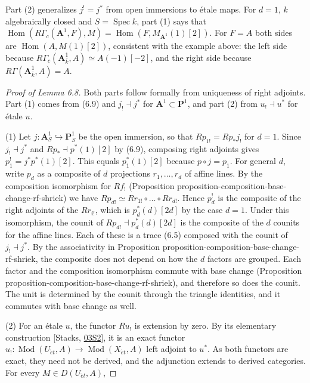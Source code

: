 \documentclass[11pt]{article}
\providecommand{\Hom}{}\renewcommand{\Hom}{\operatorname{Hom}}
\begin{document}
\label{bp539}%
Part (2) generalizes \(j^!=j^*\) from open immersions to étale maps. For \(d=1\), \(k\) algebraically closed and \(S=\operatorname{Spec}k\), part (1) says that \(\Hom(R\Gamma_c(\mathbf A^1,F),M)=\Hom(F,M_{\mathbf A^1}(1)[2])\). For \(F=A\) both sides are \(\Hom(A,M(1)[2])\), consistent with the example above: the left side because \(R\Gamma_c(\mathbf A^1_{\bar k},A)\simeq A(-1)[-2]\), and the right side because \(R\Gamma(\mathbf A^1_{\bar k},A)=A\).

\begin{proof}[{Proof of Lemma 6.8}]\label{bp540}%
Both parts follow formally from uniqueness of right adjoints. Part (1) comes from (6.9) and \(j_!\dashv j^*\) for \(\mathbf A^1\subset\mathbf P^1\), and part (2) from \(u_!\dashv u^*\) for étale \(u\).

(1) Let \(j:\mathbf A^1_S\hookrightarrow\mathbf P^1_S\) be the open immersion, so that \(Rp_{1!}=Rp_*j_!\) for \(d=1\). Since \(j_!\dashv j^*\) and \(Rp_*\dashv p^*(1)[2]\) by (6.9), composing right adjoints gives \(p_1^!=j^*p^*(1)[2]\). This equals \(p_1^*(1)[2]\) because \(p\circ j=p_1\). For general \(d\), write \(p_d\) as a composite of \(d\) projections \(r_1,\dots,r_d\) of affine lines. By the composition isomorphism for \(Rf_!\) (Proposition proposition-composition-base-change-rf-shriek) we have \(Rp_{d!}\simeq Rr_{1!}\circ\dots\circ Rr_{d!}\). Hence \(p_d^!\) is the composite of the right adjoints of the \(Rr_{i!}\), which is \(p_d^*(d)[2d]\) by the case \(d=1\). Under this isomorphism, the counit of \(Rp_{d!}\dashv p_d^*(d)[2d]\) is the composite of the \(d\) counits for the affine lines. Each of these is a trace (6.5) composed with the counit of \(j_!\dashv j^*\). By the associativity in Proposition proposition-composition-base-change-rf-shriek, the composite does not depend on how the \(d\) factors are grouped. Each factor and the composition isomorphism commute with base change (Proposition proposition-composition-base-change-rf-shriek), and therefore so does the counit. The unit is determined by the counit through the triangle identities, and it commutes with base change as well.

(2) For an étale \(u\), the functor \(Ru_!\) is extension by zero. By its elementary construction [Stacks, \href{https://stacks.math.columbia.edu/tag/03S2}{03S2}], it is an exact functor \(u_!:\operatorname{Mod}(U_{\acute{e}t},A)\to\operatorname{Mod}(X_{\acute{e}t},A)\) left adjoint to \(u^*\). As both functors are exact, they need not be derived, and the adjunction extends to derived categories. For every \(M\in D(U_{\acute{e}t},A)\),


\end{proof}
\end{document}
